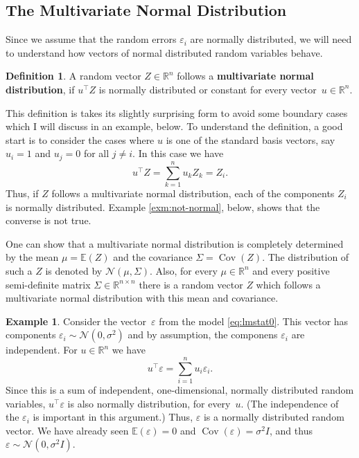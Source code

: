 \documentclass[
  a4paper,
]{article}
\theoremstyle{definition}
\newtheorem{definition}{Definition}[section]
\theoremstyle{definition}
\newtheorem{example}{Example}[section]
\theoremstyle{definition}
\theoremstyle{definition}
\theoremstyle{remark}
\begin{document}
\hypertarget{the-multivariate-normal-distribution}{%
\subsection{The Multivariate Normal Distribution}\label{the-multivariate-normal-distribution}}

Since we assume that the random errors \(\varepsilon_i\) are normally
distributed, we will need to understand how vectors of normal distributed
random variables behave.

\begin{definition}
A random vector \(Z\in\mathbb{R}^n\) follows a \textbf{multivariate normal distribution},
if \(u^\top Z\) is normally distributed or constant for every
vector~\(u\in\mathbb{R}^n\).
\end{definition}

This definition is takes its slightly surprising form to avoid
some boundary cases which I will discuss in an example, below.
To understand the
definition, a good start is to consider the cases where \(u\)
is one of the standard basis vectors, say \(u_i = 1\) and \(u_j = 0\)
for all \(j\neq i\). In this case we have
\begin{equation*}
  u^\top Z
  = \sum_{k=1}^n u_k Z_k
  = Z_i.
\end{equation*}
Thus, if \(Z\) follows a multivariate normal distribution, each of the
components \(Z_i\) is normally distributed. Example \ref{exm:not-normal},
below, shows that the converse is not true.

One can show that a multivariate normal distribution is completely determined
by the mean \(\mu = \mathbb{E}(Z)\) and the covariance \(\Sigma = \mathop{\mathrm{Cov}}(Z)\). The
distribution of such a \(Z\) is denoted by \(\mathcal{N}(\mu, \Sigma)\). Also, for every
\(\mu\in\mathbb{R}^n\) and every positive semi-definite matrix \(\Sigma\in\mathbb{R}^{n\times n}\)
there is a random vector \(Z\) which follows a multivariate normal distribution
with this mean and covariance.

\begin{example}
Consider the vector~\(\varepsilon\) from the model \eqref{eq:lmstat0}.
This vector has components \(\varepsilon_i \sim \mathcal{N}(0, \sigma^2)\) and by
assumption, the componens \(\varepsilon_i\) are independent.
For \(u\in\mathbb{R}^n\) we have
\begin{equation*}
  u^\top \varepsilon
  = \sum_{i=1}^n u_i \varepsilon_i.
\end{equation*}
Since this is a sum of independent, one-dimensional, normally distributed
random variables, \(u^\top \varepsilon\) is also normally distribution, for
every~\(u\). (The independence of the \(\varepsilon_i\) is important in this
argument.) Thus, \(\varepsilon\) is a normally distributed random vector.
We have already seen \(\mathbb{E}(\varepsilon) = 0\) and \(\mathop{\mathrm{Cov}}(\varepsilon) = \sigma^2 I\),
and thus \(\varepsilon\sim \mathcal{N}(0, \sigma^2 I)\).
\end{example}
\end{document}
